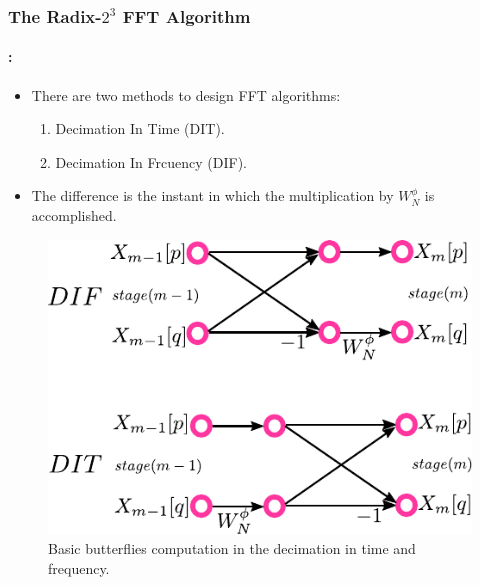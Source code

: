 \begin{frame}
  	\frametitle{\textbf{The Radix-$2^3$ FFT  Algorithm}}
	\framesubtitle{\secname : \subsecname}
	\begin{block}{\centering}
		\begin{itemize} %

			\item There are two methods to design FFT algorithms:
				\begin{enumerate}
					\item Decimation In Time (DIT).
					\item Decimation In Frcuency (DIF).
				\end{enumerate}											
				
					
			\item The difference is the instant in which the multiplication by $W_N^\phi$ is accomplished. 
			
  		\end{itemize}

  	\end{block}

    \begin{figure}[h!] \centering
    \includegraphics[width=0.45\paperwidth]{./image/DifDit.pdf}
    \caption{\footnotesize Basic butterflies computation in the decimation in time and frequency.}
    \end{figure}

\end{frame}

